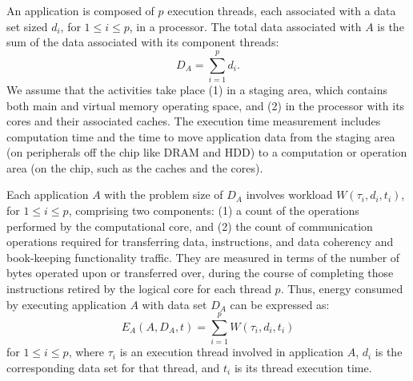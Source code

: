 \documentclass[times, 10pt,twocolumn]{IEEEtran}
\begin{document}
An application is composed of $p$ execution threads, each associated with a
data set sized $d_{i}$, for $1\leq i \leq p$, in a processor. The total
data associated with $A$ is the sum of the data associated with its
component threads:
\begin{equation}
\label{eq:totaldata} D_{A}=\displaystyle\sum_{i=1}^{p}{d_i}.
\end{equation} 
We assume that the activities take place (1) in a staging area,
which contains both main and virtual memory operating space,
and (2) in the processor with its cores and their associated caches.
The execution time measurement includes 
computation time and the time to move application data from the
staging area (on peripherals off the chip like DRAM and HDD) to a
computation or operation area (on the chip, such as the caches and the cores).

Each application $A$ with the problem size of $D_{A}$ involves workload
$W(\tau_{i},d_{i},t_{i})$, for $1 \leq i \leq p$, comprising two
components: (1) a count of the operations performed by the computational
core, and (2) the count of communication operations required for
transferring data, instructions, and data coherency and book-keeping
functionality traffic.  They are measured in terms of the number of
bytes operated upon or transferred over, during the course of completing
those instructions retired by the logical core for each thread $p$.
Thus, energy consumed by executing application $A$ with data set $D_{A}$
can be expressed as:
\begin{equation}
\label{eq:eworkload} 
E_{A}(A,D_{A},t) = \displaystyle \sum_{i=1}^{p}W(\tau_{i},d_{i},t_{i})
\end{equation}
for $1\leq i \leq p$, where $\tau_{i}$ is an execution thread involved in
application $A$, $d_{i}$ is the corresponding data set for that thread,
and $t_{i}$ is its thread execution time.
\end{document}
